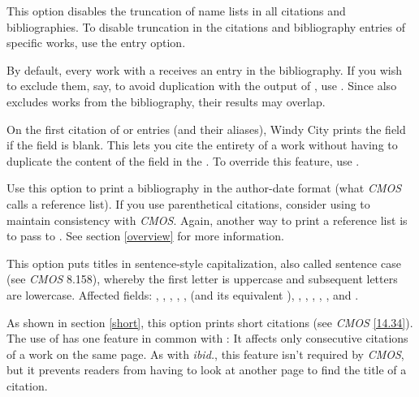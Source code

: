 \documentclass[11pt,letterpaper,oneside]{article}
\begin{document}
\begin{optionlist}
\noindent This option disables the truncation of name lists in all
citations and bibliographies. To disable truncation in the citations
and bibliography entries of specific works, use the  entry
option.


\noindent By default, every work with a  receives
an entry in the bibliography. If you wish to exclude them, say, to
avoid duplication with the output of , use
. Since  also excludes works from the
bibliography, their results may overlap.


\noindent On the first citation of  or
 entries (and their aliases), Windy City prints the
 field if the  field is blank. This
lets you cite the entirety of a work without having to duplicate the
content of the  field in the . To
override this feature, use .


\noindent Use this option to print a bibliography in the author-date
format (what \textit{CMOS} calls a reference list). If you use
parenthetical citations, consider using  to maintain
consistency with \textit{CMOS}. Again, another way to print a
reference list is to pass  to
. See section \ref{overview} for more
information.


\noindent This option puts titles in sentence-style capitalization,
also called sentence case (see \textit{CMOS} 8.158), whereby the first
letter is uppercase and subsequent letters are lowercase. Affected
fields: , ,
, , ,
 (and its equivalent ),
, , ,
, , and
.


\noindent As shown in section \ref{short}, this option prints short
citations (see \textit{CMOS} \ref{14.34}). The use of  has
one feature in common with : It affects only consecutive
citations of a work on the same page. As with \textit{ibid.}, this
feature isn't required by \textit{CMOS}, but it prevents readers from
having to look at another page to find the title of a citation.


\end{optionlist}
\end{document}
